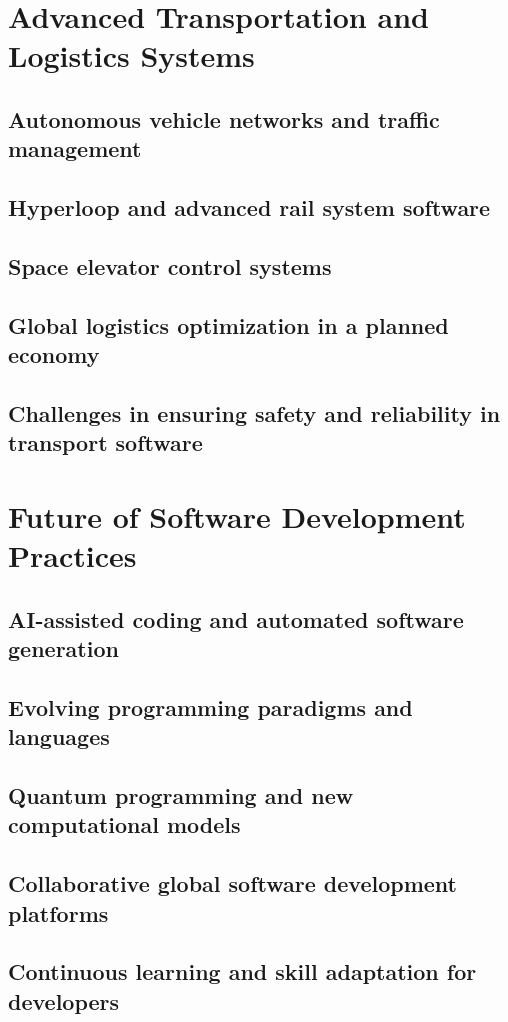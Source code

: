 \newpage

\section{Advanced Transportation and Logistics Systems}
\subsection{Autonomous vehicle networks and traffic management}
\subsection{Hyperloop and advanced rail system software}
\subsection{Space elevator control systems}
\subsection{Global logistics optimization in a planned economy}
\subsection{Challenges in ensuring safety and reliability in transport software}

\newpage

\section{Future of Software Development Practices}
\subsection{AI-assisted coding and automated software generation}
\subsection{Evolving programming paradigms and languages}
\subsection{Quantum programming and new computational models}
\subsection{Collaborative global software development platforms}
\subsection{Continuous learning and skill adaptation for developers}

